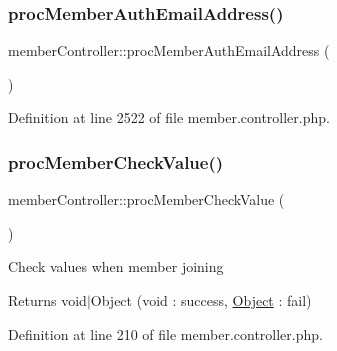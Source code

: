 \hypertarget{classmemberController_a7584206ce0ce606173fade04207fb1ea}{}\label{classmemberController_a7584206ce0ce606173fade04207fb1ea} 
\subsubsection{\texorpdfstring{proc\+Member\+Auth\+Email\+Address()}{procMemberAuthEmailAddress()}}
{\footnotesize\ttfamily member\+Controller\+::proc\+Member\+Auth\+Email\+Address (\begin{DoxyParamCaption}{ }\end{DoxyParamCaption})}



Definition at line 2522 of file member.\+controller.\+php.

\hypertarget{classmemberController_ac9e9ed09b49a295c94a4c3bad239757f}{}\label{classmemberController_ac9e9ed09b49a295c94a4c3bad239757f} 
\subsubsection{\texorpdfstring{proc\+Member\+Check\+Value()}{procMemberCheckValue()}}
{\footnotesize\ttfamily member\+Controller\+::proc\+Member\+Check\+Value (\begin{DoxyParamCaption}{ }\end{DoxyParamCaption})}

Check values when member joining

\begin{DoxyReturn}{Returns}
void$\vert$\+Object (void \+: success, \hyperlink{classObject}{Object} \+: fail) 
\end{DoxyReturn}


Definition at line 210 of file member.\+controller.\+php.

\hypertarget{classmemberController_a22dff50295755ba06fb55d60104dbb32}{}\label{classmemberController_a22dff50295755ba06fb55d60104dbb32} 
